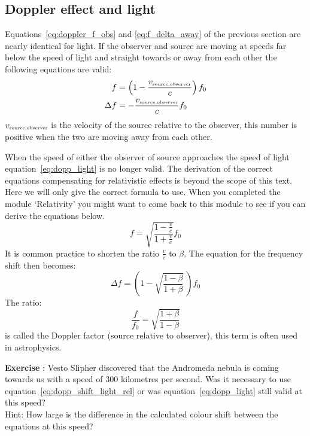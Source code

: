\documentclass[12pt,a4paper]{article}
\numberwithin{equation}{section}
\numberwithin{figure}{section}
\newcounter{Exercise}
\numberwithin{table}{section}
\begin{document}
\subsection{Doppler effect and light}
Equations~\ref{eq:doppler_f_obs} and \ref{eq:f_delta_away} of the previous section are nearly identical for light. If the observer and source are moving at speeds far below the speed of light and straight towards or away from each other the following equations are valid:
\begin{align}
f &= \left(1 - \frac{v_{\mbox{\begin{tiny}source,observer\end{tiny}}}}{c}\right) f_0 \\
\Delta f &= - \frac{v_{\mbox{\begin{tiny}source,observer\end{tiny}}}}{c} f_0 \label{eq:dopp_light} 
\end{align}
$v_{\mbox{\begin{tiny}source,observer\end{tiny}}}$ is the velocity of the source relative to the observer, this number is positive when the two are moving away from each other.

When the speed of either the observer of source approaches the speed of light equation~\ref{eq:dopp_light} is no longer valid. The derivation of the correct equations compensating for relativistic effects is beyond the scope of this text. Here we will only give the correct formula to use. When you completed the module `Relativity' you might want to come back to this module to see if you can derive the equations below.
\begin{equation}
f = \sqrt{\frac{1-\frac{v}{c}}{1+\frac{v}{c}}} f_0 \label{eq:dopp_light_rel} 
\end{equation}
It is common practice to shorten the ratio $\frac{v}{c}$ to $\beta$. The equation for the frequency shift then becomes:
\begin{equation}
\Delta f = \left( 1-\sqrt{\frac{1-\beta}{1+\beta}} ~\right)  f_0  \label{eq:dopp_shift_light_rel} 
\end{equation}
The ratio:
\begin{equation}
\frac{f}{f_0}= \sqrt{\frac{1+\beta}{1-\beta}} \label{eq:dopp_factor} 
\end{equation}
is called the Doppler factor (source relative to observer), this term is often used in astrophysics.

\begin{shaded}
\textbf{Exercise \theExercise {}} : Vesto Slipher discovered that the Andromeda nebula is coming towards us with a speed of 300 kilometres per second. Was it necessary to use equation~\ref{eq:dopp_shift_light_rel} or was equation~\ref{eq:dopp_light} still valid at this speed?\\
Hint: How large is the difference in the calculated colour shift between the equations at this speed?
\end{shaded}
\end{document}
